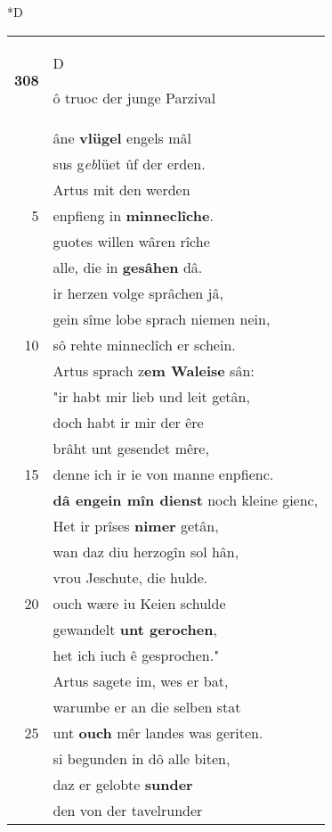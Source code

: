 \documentclass[8pt,a4paper,notitlepage]{article}
\begin{document}
\begin{table}[ht]
\begin{minipage}[t]{0.5\linewidth}
\small
\begin{center}*D
\end{center}
\begin{tabular}{rl}
\textbf{308} & \begin{large}D\end{large}ô truoc der junge Parzival\\ 
 & âne \textbf{vlügel} engels mâl\\ 
 & sus g\textit{eb}lüet ûf der erden.\\ 
 & Artus mit den werden\\ 
5 & enpfieng in \textbf{minneclîche}.\\ 
 & guotes willen wâren rîche\\ 
 & alle, die in \textbf{gesâhen} dâ.\\ 
 & ir herzen volge sprâchen jâ,\\ 
 & gein sîme lobe sprach niemen nein,\\ 
10 & sô rehte minneclîch er schein.\\ 
 & Artus sprach z\textbf{em Waleise} sân:\\ 
 & "ir habt mir lieb und leit getân,\\ 
 & doch habt ir mir der êre\\ 
 & brâht unt gesendet mêre,\\ 
15 & denne ich ir ie von manne enpfienc.\\ 
 & \textbf{dâ engein mîn dienst} noch kleine gienc,\\ 
 & Het ir prîses \textbf{nimer} getân,\\ 
 & wan daz diu herzogîn sol hân,\\ 
 & vrou Jeschute, die hulde.\\ 
20 & ouch wære iu Keien schulde\\ 
 & gewandelt \textbf{unt gerochen},\\ 
 & het ich iuch ê gesprochen."\\ 
 & Artus sagete im, wes er bat,\\ 
 & warumbe er an die selben stat\\ 
25 & unt \textbf{ouch} mêr landes was geriten.\\ 
 & si begunden in dô alle biten,\\ 
 & daz er gelobte \textbf{sunder}\\ 
 & den von der tavelrunder\\ 

\end{tabular}
\end{minipage}
\end{table}
\end{document}
